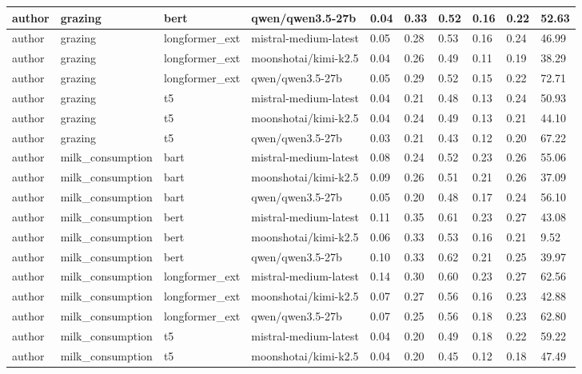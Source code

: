 \begin{tabular}{|l|l|l|l|l|l|l|l|l|l|}
 \hline
 author & grazing & bert & qwen/qwen3.5-27b & 0.04 & 0.33 & 0.52 & 0.16 & 0.22 & 52.63 \\
 \hline
 author & grazing & longformer\_ext & mistral-medium-latest & 0.05 & 0.28 & 0.53 & 0.16 & 0.24 & 46.99 \\
 \hline
 author & grazing & longformer\_ext & moonshotai/kimi-k2.5 & 0.04 & 0.26 & 0.49 & 0.11 & 0.19 & 38.29 \\
 \hline
 author & grazing & longformer\_ext & qwen/qwen3.5-27b & 0.05 & 0.29 & 0.52 & 0.15 & 0.22 & 72.71 \\
 \hline
 author & grazing & t5 & mistral-medium-latest & 0.04 & 0.21 & 0.48 & 0.13 & 0.24 & 50.93 \\
 \hline
 author & grazing & t5 & moonshotai/kimi-k2.5 & 0.04 & 0.24 & 0.49 & 0.13 & 0.21 & 44.10 \\
 \hline
 author & grazing & t5 & qwen/qwen3.5-27b & 0.03 & 0.21 & 0.43 & 0.12 & 0.20 & 67.22 \\
 \hline
 author & milk\_consumption & bart & mistral-medium-latest & 0.08 & 0.24 & 0.52 & 0.23 & 0.26 & 55.06 \\
 \hline
 author & milk\_consumption & bart & moonshotai/kimi-k2.5 & 0.09 & 0.26 & 0.51 & 0.21 & 0.26 & 37.09 \\
 \hline
 author & milk\_consumption & bart & qwen/qwen3.5-27b & 0.05 & 0.20 & 0.48 & 0.17 & 0.24 & 56.10 \\
 \hline
 author & milk\_consumption & bert & mistral-medium-latest & 0.11 & 0.35 & 0.61 & 0.23 & 0.27 & 43.08 \\
 \hline
 author & milk\_consumption & bert & moonshotai/kimi-k2.5 & 0.06 & 0.33 & 0.53 & 0.16 & 0.21 & 9.52 \\
 \hline
 author & milk\_consumption & bert & qwen/qwen3.5-27b & 0.10 & 0.33 & 0.62 & 0.21 & 0.25 & 39.97 \\
 \hline
 author & milk\_consumption & longformer\_ext & mistral-medium-latest & 0.14 & 0.30 & 0.60 & 0.23 & 0.27 & 62.56 \\
 \hline
 author & milk\_consumption & longformer\_ext & moonshotai/kimi-k2.5 & 0.07 & 0.27 & 0.56 & 0.16 & 0.23 & 42.88 \\
 \hline
 author & milk\_consumption & longformer\_ext & qwen/qwen3.5-27b & 0.07 & 0.25 & 0.56 & 0.18 & 0.23 & 62.80 \\
 \hline
 author & milk\_consumption & t5 & mistral-medium-latest & 0.04 & 0.20 & 0.49 & 0.18 & 0.22 & 59.22 \\
 \hline
 author & milk\_consumption & t5 & moonshotai/kimi-k2.5 & 0.04 & 0.20 & 0.45 & 0.12 & 0.18 & 47.49 \\

\end{tabular}
